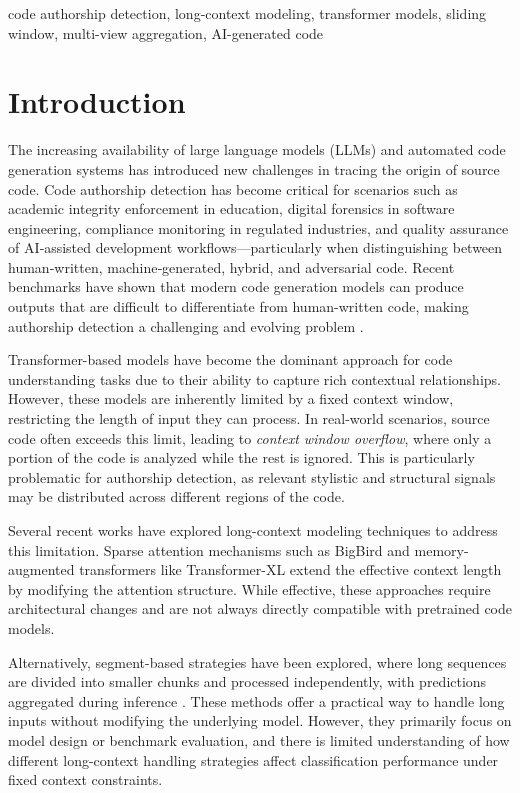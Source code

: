 \documentclass[conference]{IEEEtran}
\begin{document}
\vspace{0.5em}

\begin{IEEEkeywords}
code authorship detection, long-context modeling, transformer models, sliding window, multi-view aggregation, AI-generated code
\end{IEEEkeywords}

\section{Introduction}

The increasing availability of large language models (LLMs) and automated code generation systems has introduced new challenges in tracing the origin of source code. Code authorship detection has become critical for scenarios such as academic integrity enforcement in education, digital forensics in software engineering, compliance monitoring in regulated industries, and quality assurance of AI‑assisted development workflows—particularly when distinguishing between human‑written, machine‑generated, hybrid, and adversarial code. Recent benchmarks have shown that modern code generation models can produce outputs that are difficult to differentiate from human-written code, making authorship detection a challenging and evolving problem \cite{chen2021codex}\cite{fried2022incoder}.


Transformer-based models have become the dominant approach for code understanding tasks due to their ability to capture rich contextual relationships. However, these models are inherently limited by a fixed context window, restricting the length of input they can process. In real-world scenarios, source code often exceeds this limit, leading to \textit{context window overflow}, where only a portion of the code is analyzed while the rest is ignored. This is particularly problematic for authorship detection, as relevant stylistic and structural signals may be distributed across different regions of the code.

Several recent works have explored long-context modeling techniques to address this limitation. Sparse attention mechanisms such as BigBird \cite{zaheer2020bigbird} and memory-augmented transformers like Transformer-XL \cite{dai2019transformerxl} extend the effective context length by modifying the attention structure. While effective, these approaches require architectural changes and are not always directly compatible with pretrained code models. 

Alternatively, segment-based strategies have been explored, where long sequences are divided into smaller chunks and processed independently, with predictions aggregated during inference \cite{khandelwal2020generalization}. These methods offer a practical way to handle long inputs without modifying the underlying model. However, they primarily focus on model design or benchmark evaluation, and there is limited understanding of how different long-context handling strategies affect classification performance under fixed context constraints.\
\end{document}
